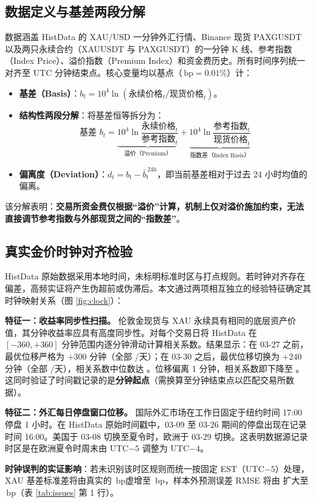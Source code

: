 \documentclass[UTF8,zihao=5,a4paper]{ctexart}
\newcommand{\key}[1]{\textbf{#1}}
\newcommand{\bp}{\ensuremath{\,\mathrm{bp}}}
\begin{document}
\subsection{数据定义与基差两段分解}
数据涵盖 HistData 的 XAU/USD 一分钟外汇行情、Binance 现货 PAXGUSDT 以及两只永续合约（XAUUSDT 与 PAXGUSDT）的一分钟 K 线、参考指数（Index Price）、溢价指数（Premium Index）和资金费历史。所有时间序列统一对齐至 UTC 分钟结束点。核心变量均以基点（$\bp = 0.01\%$）计：
\begin{itemize}
\item \key{基差（Basis）}：$b_t = 10^4 \ln(\text{永续价格}_t / \text{现货价格}_t)$。
\item \key{结构性两段分解}：将基差恒等拆分为：
$$\text{基差 } b_t = \underbrace{10^4\ln\frac{\text{永续价格}_t}{\text{参考指数}_t}}_{\text{溢价（Premium）}} + \underbrace{10^4\ln\frac{\text{参考指数}_t}{\text{现货价格}_t}}_{\text{指数差（Index Basis）}}$$
\item \key{偏离度（Deviation）}：$d_t = b_t - \bar{b}_t^{\,24\text{h}}$，即当前基差相对于过去 24 小时均值的偏离。
\end{itemize}
该分解表明：\textbf{交易所资金费仅根据“溢价”计算，机制上仅对溢价施加约束，无法直接调节参考指数与外部现货之间的“指数差”}。

\subsection{真实金价时钟对齐检验}
HistData 原始数据采用本地时间，未标明标准时区与打点规则。若时钟对齐存在偏差，高频实证将产生伪超前或伪滞后。本文通过两项相互独立的经验特征确定其时钟映射关系（图 \ref{fig:clock}）：

\key{特征一：收益率同步性扫描。} 伦敦金现货与 XAU 永续具有相同的底层资产价值，其分钟收益率应具有高度同步性。对每个交易日将 HistData 在 $[-360, +360]$ 分钟范围内逐分钟滑动计算相关系数。结果显示：在 03-27 之前，最优位移严格为 $+300$ 分钟（全部 \ckPreDays/\ckPreN 天）；在 03-30 之后，最优位移切换为 $+240$ 分钟（全部 \ckPostDays/\ckPostN 天），相关系数中位数达 \ckCorrPost。位移偏离 1 分钟，相关系数即下降至 \ckNeighbor。这同时验证了时间戳记录的是\key{分钟起点}（需换算至分钟结束点以匹配交易所数据）。

\key{特征二：外汇每日停盘窗口位移。} 国际外汇市场在工作日固定于纽约时间 17:00 停盘 1 小时。在 HistData 原始时间戳中，03-09 至 03-26 期间的停盘出现在记录时间 16:00。美国于 03-08 切换至夏令时，欧洲于 03-29 切换。这表明数据源记录时区是在欧洲夏令时周末由 UTC$-5$ 调整为 UTC$-4$。

\key{时钟误判的实证影响}：若未识别该时区规则而统一按固定 EST（UTC$-5$）处理，XAU 基差标准差将由真实的 \qClockSdRule\bp 虚增至 \qClockSdEst\bp，样本外预测误差 RMSE 将由 \qClockBase 扩大至 \qClockEst\bp（表 \ref{tab:issues} 第 1 行）。
\end{document}
